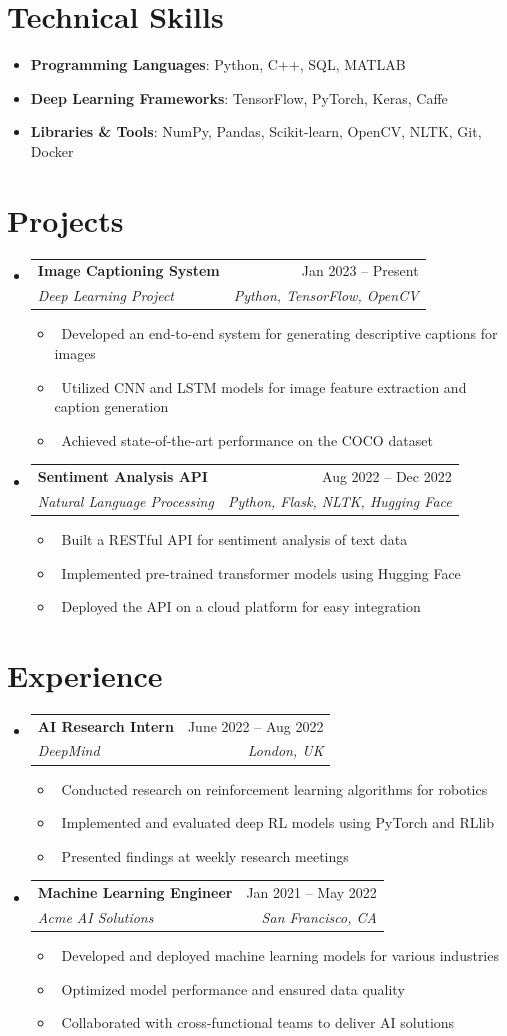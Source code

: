 \documentclass[letterpaper,10pt]{article}
\makeatletter
\newcommand{\resumeItem}[1]{\item\small{#1}}
\newcommand{\resumeSubheading}[4]{
\vspace{-1pt}\item
  \begin{tabular*}{0.97\textwidth}[t]{l@{\extracolsep{\fill}}r}
    \textbf{#1} & #2 \\
    \textit{#3} & \textit{#4} \\
  \end{tabular*}\vspace{-7pt}
}
\newcommand{\resumeSubHeadingList}{\begin{itemize}[leftmargin=0.15in, label={}]}
\newcommand{\resumeSubHeadingListEnd}{\end{itemize}}
\makeatother
\begin{document}
\section{Technical Skills}
\resumeSubHeadingList
  \resumeItem{\textbf{Programming Languages}: Python, C++, SQL, MATLAB}
  \resumeItem{\textbf{Deep Learning Frameworks}: TensorFlow, PyTorch, Keras, Caffe}
  \resumeItem{\textbf{Libraries \& Tools}: NumPy, Pandas, Scikit-learn, OpenCV, NLTK, Git, Docker}
\resumeSubHeadingListEnd

\section{Projects}
\resumeSubHeadingList
  \resumeSubheading
      {Image Captioning System}{Jan 2023 -- Present}
      {Deep Learning Project}{Python, TensorFlow, OpenCV}
      \resumeSubHeadingList
          \resumeItem{\textbullet\ Developed an end-to-end system for generating descriptive captions for images}
          \resumeItem{\textbullet\ Utilized CNN and LSTM models for image feature extraction and caption generation}
          \resumeItem{\textbullet\ Achieved state-of-the-art performance on the COCO dataset}
      \resumeSubHeadingListEnd
  \resumeSubheading
      {Sentiment Analysis API}{Aug 2022 -- Dec 2022} 
      {Natural Language Processing}{Python, Flask, NLTK, Hugging Face}
      \resumeSubHeadingList
          \resumeItem{\textbullet\ Built a RESTful API for sentiment analysis of text data}
          \resumeItem{\textbullet\ Implemented pre-trained transformer models using Hugging Face}
          \resumeItem{\textbullet\ Deployed the API on a cloud platform for easy integration}
      \resumeSubHeadingListEnd
\resumeSubHeadingListEnd

\section{Experience}
\resumeSubHeadingList
  \resumeSubheading
      {AI Research Intern}{June 2022 -- Aug 2022}
      {DeepMind}{London, UK}
      \resumeSubHeadingList
          \resumeItem{\textbullet\ Conducted research on reinforcement learning algorithms for robotics}
          \resumeItem{\textbullet\ Implemented and evaluated deep RL models using PyTorch and RLlib}
          \resumeItem{\textbullet\ Presented findings at weekly research meetings}
      \resumeSubHeadingListEnd
  \resumeSubheading
      {Machine Learning Engineer}{Jan 2021 -- May 2022}
      {Acme AI Solutions}{San Francisco, CA}
      \resumeSubHeadingList
          \resumeItem{\textbullet\ Developed and deployed machine learning models for various industries}
          \resumeItem{\textbullet\ Optimized model performance and ensured data quality}
          \resumeItem{\textbullet\ Collaborated with cross-functional teams to deliver AI solutions}
      \resumeSubHeadingListEnd
\resumeSubHeadingListEnd
\end{document}
